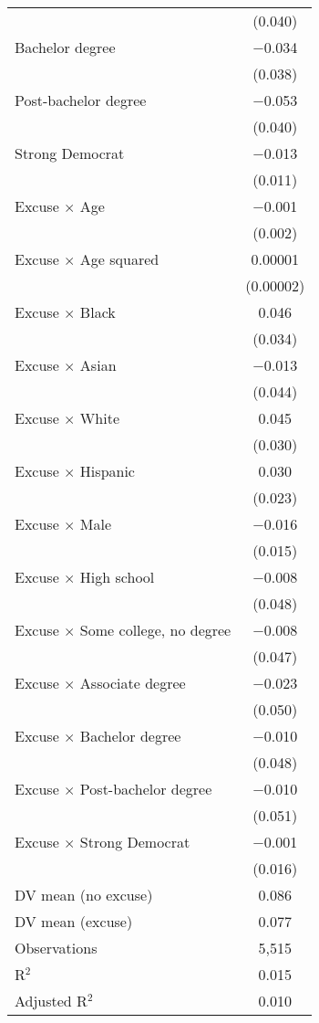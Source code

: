 \begin{center}
\begin{ThreePartTable}
\begin{longtable}{lc}
  & (0.040) \\ 
 \addlinespace 
 Bachelor degree & $-$0.034 \\ 
  & (0.038) \\ 
 \addlinespace 
 Post-bachelor degree & $-$0.053 \\ 
  & (0.040) \\ 
 \addlinespace 
 Strong Democrat & $-$0.013 \\ 
  & (0.011) \\ 
 \addlinespace 
 Excuse $\times$ Age & $-$0.001 \\ 
  & (0.002) \\ 
 \addlinespace 
 Excuse $\times$ Age squared & 0.00001 \\ 
  & (0.00002) \\ 
 \addlinespace 
 Excuse $\times$ Black & 0.046 \\ 
  & (0.034) \\ 
 \addlinespace 
 Excuse $\times$ Asian & $-$0.013 \\ 
  & (0.044) \\ 
 \addlinespace 
 Excuse $\times$ White & 0.045 \\ 
  & (0.030) \\ 
 \addlinespace 
 Excuse $\times$ Hispanic & 0.030 \\ 
  & (0.023) \\ 
 \addlinespace 
 Excuse $\times$ Male & $-$0.016 \\ 
  & (0.015) \\ 
 \addlinespace 
 Excuse $\times$ High school & $-$0.008 \\ 
  & (0.048) \\ 
 \addlinespace 
 Excuse $\times$ Some college, no degree & $-$0.008 \\ 
  & (0.047) \\ 
 \addlinespace 
 Excuse $\times$ Associate degree & $-$0.023 \\ 
  & (0.050) \\ 
 \addlinespace 
 Excuse $\times$ Bachelor degree & $-$0.010 \\ 
  & (0.048) \\ 
 \addlinespace 
 Excuse $\times$ Post-bachelor degree & $-$0.010 \\ 
  & (0.051) \\ 
 \addlinespace 
 Excuse $\times$ Strong Democrat & $-$0.001 \\ 
  & (0.016) \\ 
 \addlinespace 
\midrule  
DV mean (no excuse) & 0.086 \\
DV mean (excuse) & 0.077 \\
Observations & 5,515 \\ 
R$^{2}$ & 0.015 \\ 
Adjusted R$^{2}$ & 0.010 \\ 
\bottomrule 
\end{longtable}
\end{ThreePartTable}
\end{center}
